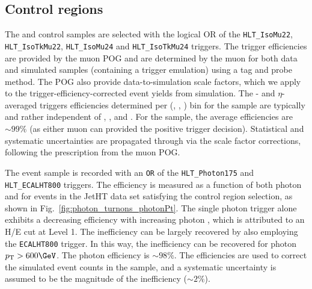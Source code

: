 \subsection{Control regions\label{sec:control_samples}}

The \mj and \mmj control samples are selected with the logical OR of
the \verb!HLT_IsoMu22!, \verb!HLT_IsoTkMu22!, \verb!HLT_IsoMu24! and
\verb!HLT_IsoTkMu24! triggers. The trigger efficiencies are provided
by the muon POG and are determined by the muon for both data and
simulated samples (containing a trigger emulation) using a tag and
probe method. The POG also provide data-to-simulation scale factors,
which we apply to the trigger-efficiency-corrected event yields from
simulation. The \Pt- and $\eta$-averaged triggers efficiencies
determined per (\njet, \nb, \scalht) bin for the \mj sample are
typically and rather independent of \njet, \nb, and \scalht. For the
\mmj sample, the average efficiencies are $\sim99\%$ (as either muon
can provided the positive trigger decision). Statistical and
systematic uncertainties are propagated through via the scale factor
corrections, following the prescription from the muon POG.

The \gj event sample is recorded with an \verb!OR! of the
\verb!HLT_Photon175! and \verb!HLT_ECALHT800! triggers. The efficiency
is measured as a function of both photon \Pt and \HTmiss for events in
the JetHT data set satisfying the \gj control region selection, as
shown in Fig.~\ref{fig:photon_turnons_photonPt}. The single photon
trigger alone exhibits a decreasing efficiency with increasing photon
\Pt, which is attributed to an H/E cut at Level 1. The inefficiency
can be largely recovered by also employing the \verb!ECALHT800!
trigger. In this way, the inefficiency can be recovered for photon
$\Pt > 600\GeV$. The photon efficiency is $\sim 98\%$. The
efficiencies are used to correct the simulated event counts in the \gj
sample, and a systematic uncertainty is assumed to be the magnitude of
the inefficiency ($\sim 2\%$).


